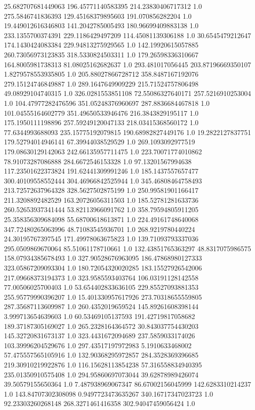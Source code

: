 25.682707681449063	196.45771140583395	214.23830406717312	1.0
275.5846741836393	129.45168379895603	191.070856282204	1.0
19.449012616346803	141.2042785005493	180.96699409883138	1.0
233.1355700374391	229.1186429497209	114.45081139306188	1.0
30.6545479212647	174.1430424083384	229.94813275929565	1.0
142.19920615057885	260.73056973123835	318.5330824503311	1.0
179.26598336310667	164.8005981738313	81.08025162682637	1.0
293.481017056445	203.87196669350107	1.8279578553935805	1.0
205.88027866728712	358.8487167192076	279.15124746849887	1.0
289.1647649909229	215.71524757806498	49.08929104740315	1.0
326.0281553851108	72.55086327640171	257.5216910253004	1.0
104.47977282476596	351.05248376960697	287.8836684467818	1.0
101.04555164602779	351.49650533946476	216.3843829195117	1.0
175.1950111198896	257.59249120047133	218.03415368560172	1.0
77.6344993688093	235.15775192079815	190.68982827449176	1.0
19.2822127837751	179.52794014946141	67.39944038529529	1.0
269.1093092977519	179.08630129142063	242.66135957711475	1.0
223.70071774010862	78.91073287086888	284.6672546153328	1.0
97.13201567994638	117.23501622373824	191.62441309991246	1.0
185.1437557657477	300.40109558552444	304.46966842525944	1.0
345.46808464758493	213.72572637964328	328.5627502875199	1.0
250.99581901166417	211.3208892482529	163.20726056311503	1.0
185.52781281633736	260.52653937341444	53.82113966091762	1.0
358.79594805911205	25.358356309684098	55.68700618613871	1.0
224.49161748640068	347.72480265063996	48.71083545936701	1.0
268.9219780440224	24.30195767397545	171.49978063675823	1.0
139.71093793337036	295.0509869670064	85.51061178710661	1.0
132.43851765363297	48.8317075986575	158.07934385678493	1.0
327.90528676963095	186.47868980127333	323.05867209093304	1.0
180.72054320020285	183.15527926542006	217.09668373194373	1.0
323.9585593403764	106.03191128142558	77.00506025700403	1.0
53.654402833636105	229.85527093881353	255.95779990396207	1.0
15.401330957617926	273.70318655559805	287.35687113609987	1.0
260.4352019659524	145.89261608398144	3.999713654639603	1.0
60.53469105137593	191.42719817058682	189.37187305169027	1.0
265.2328164364572	30.843037754430203	145.32720831673137	1.0
323.4431672094689	237.5859033174026	103.39996204529676	1.0
297.43517197972983	5.1910633468002	57.475557565105916	1.0
132.90368295972857	284.3528369396685	219.30910219922876	1.0
116.15628113854238	57.316558834940395	235.01350910575408	1.0
294.95860697073044	39.62878989426074	39.50579155650364	1.0
7.487938969067347	86.67002156045999	142.6283310214237	1.0
143.84707302308098	0.9497723473635267	340.16717347023723	1.0
92.23303260268148	268.3271461416358	302.94047459056424	1.0
